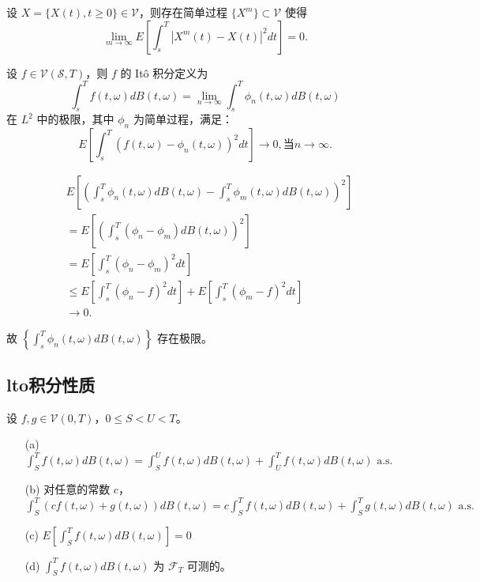 \documentclass[lang=cn,10pt,thmcnt=section]{elegantbook}
\begin{document}
\begin{theorem}
	设 \( X = \{X(t), t \geq 0\} \in \mathcal{V} \)，则存在简单过程 \(\{X^m\} \subset \mathcal{V}\) 使得
\[
\lim_{m \to \infty} E\left[\int_s^T |X^m(t) - X(t)|^2 dt\right] = 0.
\]
\end{theorem}
\begin{definition}
	设 \( f \in \mathcal{V}(\mathcal{S}, T) \)，则 \( f \) 的 Itô 积分定义为
\[
\int_s^T f(t, \omega) dB(t, \omega) = \lim_{n \to \infty} \int_s^T \phi_n(t, \omega) dB(t, \omega)
\]
在 \( L^2 \) 中的极限，其中 \( \phi_n \) 为简单过程，满足：
\[
E\left[\int_s^T \left(f(t, \omega) - \phi_n(t, \omega)\right)^2 dt\right] \to 0, \text{当} n \to \infty.
\]
\end{definition}

\begin{remark}

	\begin{align*}
		&E\left[\left(\int_s^T \phi_n(t, \omega) dB(t, \omega) - \int_s^T \phi_m(t, \omega) dB(t, \omega)\right)^2\right] \\
		&= E\left[\left(\int_s^T (\phi_n - \phi_m) dB(t, \omega)\right)^2\right] \\
		&= E\left[\int_s^T (\phi_n - \phi_m)^2 dt\right] \\
		&\leq E\left[\int_s^T (\phi_n - f)^2 dt\right] + E\left[\int_s^T (\phi_m - f)^2 dt\right] \\
		&\to 0.
		\end{align*}
		
		故 \(\left\{\int_s^T \phi_n(t, \omega) dB(t, \omega)\right\}\) 存在极限。
\end{remark}
\subsection{lto积分性质}

\begin{theorem}
	设 \( f, g \in \mathcal{V}(0, T) \)，\( 0 \leq S < U < T \)。

\begin{enumerate}
    \item[(a)] \(\int_S^T f(t, \omega) dB(t, \omega) = \int_S^U f(t, \omega) dB(t, \omega) + \int_U^T f(t, \omega) dB(t, \omega) \text{ a.s.}\)
    \item[(b)] 对任意的常数 \( c \)，\(\int_S^T (cf(t, \omega) + g(t, \omega)) dB(t, \omega) = c \int_S^T f(t, \omega) dB(t, \omega) + \int_S^T g(t, \omega) dB(t, \omega) \text{ a.s.}\)
    \item[(c)] \(E\left[\int_S^T f(t, \omega) dB(t, \omega)\right] = 0\)
    \item[(d)] \(\int_S^T f(t, \omega) dB(t, \omega)\) 为 \(\mathcal{F}_T\) 可测的。
\end{enumerate}
\end{theorem}
\end{document}
